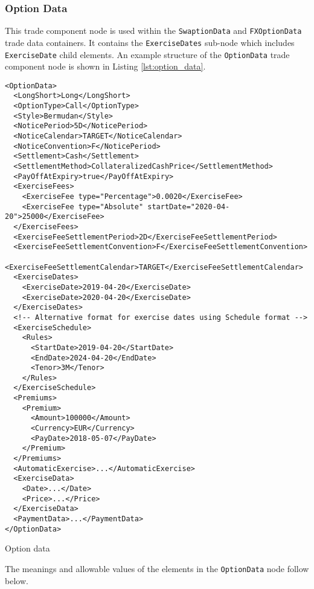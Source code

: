 \subsubsection{Option Data}
\label{ss:option_data} 
This trade component node is used within the \lstinline!SwaptionData! and \lstinline!FXOptionData! trade data
containers. It contains the \lstinline!ExerciseDates! sub-node which includes \lstinline!ExerciseDate! child
elements. An example structure of the \lstinline!OptionData! trade component node is shown in Listing
\ref{lst:option_data}.

\begin{listing}[H]
\begin{verbatim}
<OptionData>
  <LongShort>Long</LongShort>
  <OptionType>Call</OptionType>
  <Style>Bermudan</Style>
  <NoticePeriod>5D</NoticePeriod>
  <NoticeCalendar>TARGET</NoticeCalendar>
  <NoticeConvention>F</NoticePeriod>
  <Settlement>Cash</Settlement>
  <SettlementMethod>CollateralizedCashPrice</SettlementMethod>
  <PayOffAtExpiry>true</PayOffAtExpiry>
  <ExerciseFees>
    <ExerciseFee type="Percentage">0.0020</ExerciseFee>
    <ExerciseFee type="Absolute" startDate="2020-04-20">25000</ExerciseFee>
  </ExerciseFees>
  <ExerciseFeeSettlementPeriod>2D</ExerciseFeeSettlementPeriod>
  <ExerciseFeeSettlementConvention>F</ExerciseFeeSettlementConvention>
  <ExerciseFeeSettlementCalendar>TARGET</ExerciseFeeSettlementCalendar>
  <ExerciseDates>
    <ExerciseDate>2019-04-20</ExerciseDate>
    <ExerciseDate>2020-04-20</ExerciseDate>
  </ExerciseDates>
  <!-- Alternative format for exercise dates using Schedule format -->
  <ExerciseSchedule>
    <Rules>
      <StartDate>2019-04-20</StartDate>
      <EndDate>2024-04-20</EndDate>
      <Tenor>3M</Tenor>
    </Rules>
  </ExerciseSchedule>
  <Premiums>
    <Premium>
      <Amount>100000</Amount>
      <Currency>EUR</Currency>
      <PayDate>2018-05-07</PayDate>
    </Premium>
  </Premiums>
  <AutomaticExercise>...</AutomaticExercise>
  <ExerciseData>
    <Date>...</Date>
    <Price>...</Price>
  </ExerciseData>
  <PaymentData>...</PaymentData>
</OptionData>
\end{verbatim}
\caption{Option data}
\label{lst:option_data}
\end{listing}

The meanings and allowable values of the elements in the \lstinline!OptionData! node follow below.

